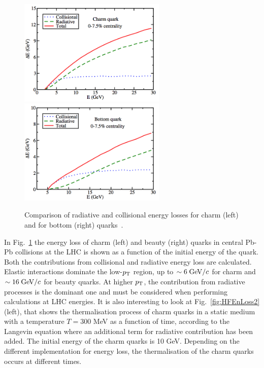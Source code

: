 \begin{figure}[!ht]
  \centering
  \includegraphics[width=7cm]{FigCap2/HFEnLoss1.png}
  \includegraphics[width=7cm]{FigCap2/HFEnLoss2.png}
  \caption{Comparison of radiative and collisional energy losses for charm (left) and for bottom (right) quarks~\cite{Cao:2013ita}.}
  \label{fig:HFEnLoss}
\end{figure}
In Fig.~\ref{fig:HFEnLoss} the energy loss of charm (left) and beauty (right) quarks 
in central Pb-Pb collisions at the LHC is shown as a function of the initial energy of the quark.
Both the contributions from collisional and radiative energy loss are calculated. Elastic interactions
dominate the low-$p_{\rm T}$ region, up to $\sim 6\; \mathrm{GeV}/c$ for charm and $\sim 16 \;\mathrm{GeV}/c$ for beauty quarks.
At higher $p_{\rm T}$, the contribution from radiative processes is the dominant one and must be considered when 
performing calculations at LHC energies.
It is also interesting to look at Fig.~\ref{fig:HFEnLoss2} (left), that shows the thermalisation process of charm quarks in a static medium with a temperature
$T = 300$ MeV as a function of time, according to the Langevin equation where an additional term for radiative contribution has been added. 
The initial energy of the charm quarks is 10 GeV. Depending on the different implementation for energy
loss, the thermalisation of the charm quarks occurs at different times.\\
